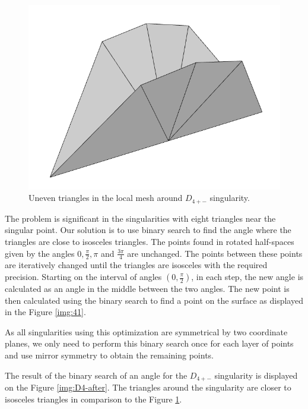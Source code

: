 \begin{figure}
    \centerline{\includegraphics[scale=0.25]{images/D4-before}}
    \caption[Uneven triangles in the local mesh around $D_{4+-}$ singularity]
    {Uneven triangles in the local mesh around $D_{4+-}$ singularity.}
    \label{img:D4-before}
\end{figure}

The problem is significant in the singularities with eight triangles near
the singular point.
Our solution is to use binary search to find the angle where the triangles are
close to isosceles triangles. The points found in rotated half-spaces given by 
the angles $0, \frac{\pi}{2}, \pi$ and $\frac{3\pi}{4}$ are unchanged.
The points between these points are iteratively changed until the
triangles are isosceles with the required precision. Starting on the interval 
of angles $(0, \frac{\pi}{2})$, in each step, 
the new angle is calculated as an angle in the middle 
between the two angles. The new point is then calculated using the binary 
search to find a point on the surface as displayed in the Figure \ref{img:41}.

As all singularities using this optimization are symmetrical by two coordinate
planes, we only need to perform this binary search once for each layer of 
points and use mirror symmetry to obtain the remaining points.

The result of the binary 
search of an angle for the $D_{4+-}$ singularity is displayed 
on the Figure \ref{img:D4-after}. The triangles around the singularity
are closer to isosceles triangles in comparison to the Figure 
\ref{img:D4-before}.

